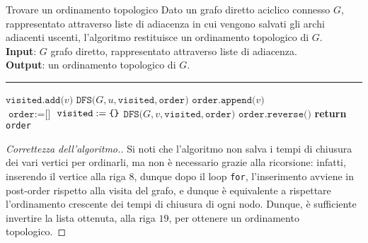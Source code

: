 \documentclass[a4paper, 12pt]{report}
\begin{document}
    \begin{framedalgo}{Trovare un ordinamento topologico}
        Dato un grafo diretto aciclico connesso $G$, rappresentato attraverso liste di adiacenza in cui vengono salvati gli archi adiacenti uscenti, l'algoritmo restituisce un ordinamento topologico di $G$.\\
        \textbf{Input}: $G$ grafo diretto, rappresentato attraverso liste di adiacenza.\\
        \textbf{Output}: un ordinamento topologico di $G$.

        \hrule
        \begin{algorithmic}[1]
                \State $\texttt{visited.add(}v\texttt{)}$
                 
                        \State $\texttt{DFS(}G, u, \texttt{visited},\texttt{order)}$
                    \EndIf
                \EndFor
                \State $\texttt{order.append(}v\texttt{)}$ 
            \EndFunction
            \\
                \State $\texttt{order} := \texttt{[]}$
                \State $\texttt{visited} := \verb|{|\verb|}|$
                        \State $\texttt{DFS(}G, v, \texttt{visited},\texttt{order)}$
                    \EndIf
                \EndFor
                \State $\texttt{order.reverse()}$ 
                \State \textbf{return} \texttt{order}
            \EndFunction
        \end{algorithmic}
    \end{framedalgo}

    \begin{proof}[Correttezza dell'algoritmo.]
        Si noti che l'algoritmo non salva i tempi di chiusura dei vari vertici per ordinarli, ma non è necessario grazie alla ricorsione: infatti, inserendo il vertice alla riga $8$, dunque dopo il loop \texttt{for}, l'inserimento avviene in post-order rispetto alla visita del grafo, e dunque è equivalente a rispettare l'ordinamento crescente dei tempi di chiusura di ogni nodo. Dunque, è sufficiente invertire la lista ottenuta, alla riga $19$, per ottenere un ordinamento topologico.
    \end{proof}
\end{document}
